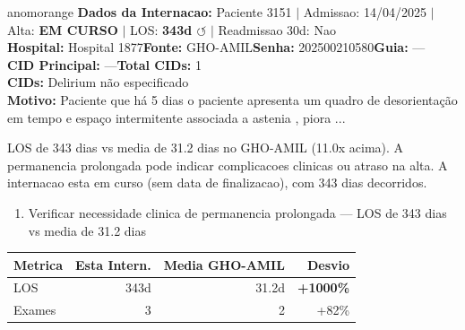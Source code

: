 \documentclass[a4paper,10pt]{article}
\begin{document}
\begin{anomalycard}[Internacao 3592 | GHO-AMIL | ALTO (z=3.08)]{anomorange}
\textbf{Dados da Internacao:} Paciente 3151 $\mid$ Admissao: 14/04/2025 $\mid$ Alta: \textcolor{anomorange}{\textbf{EM CURSO}} $\mid$ LOS: \textbf{343d \textcolor{anomorange}{$\circlearrowleft$}} $\mid$ Readmissao 30d: Nao\\
\textbf{Hospital:} Hospital 1877\quad\textbf{Fonte:} GHO-AMIL\quad\textbf{Senha:} 202500210580\quad\textbf{Guia:} ---\\
\textbf{CID Principal:} {\small ---}\quad\textbf{Total CIDs:} 1\\

\textbf{CIDs:} {\scriptsize Delirium não especificado}\\

\textbf{Motivo:} {\scriptsize Paciente que há 5 dias o paciente apresenta um quadro de desorientação em tempo e espaço intermitente associada a astenia , piora ...}\\

\vspace{2pt}\begin{tcolorbox}[colback=severityred!20,colframe=anomorange,title={\textbf{Interpretacao de Negocio}},fonttitle=\bfseries\small,left=4pt,right=4pt,top=3pt,bottom=3pt]
{\small LOS de 343 dias vs media de 31.2 dias no GHO-AMIL (11.0x acima). A permanencia prolongada pode indicar complicacoes clinicas ou atraso na alta. A internacao esta em curso (sem data de finalizacao), com 343 dias decorridos.}
\end{tcolorbox}
\begin{tcolorbox}[colback=severityyellow!30,colframe=anomorange,title={\textbf{Recomendacoes Especificas}},fonttitle=\bfseries\small,left=4pt,right=4pt,top=3pt,bottom=3pt]
\begin{enumerate}[nosep,leftmargin=16pt]
\item {\small Verificar necessidade clinica de permanencia prolongada --- LOS de 343 dias vs media de 31.2 dias}
\end{enumerate}
\end{tcolorbox}
\begin{center}\begin{tabular}{l r r r}\toprule\textbf{Metrica} & \textbf{Esta Intern.} & \textbf{Media GHO-AMIL} & \textbf{Desvio} \\\midrule
LOS & 343d & 31.2d & \textcolor{anomred}{\textbf{+1000\%}} \\
Exames & 3 & 2 & \textcolor{anomorange}{+82\%} \\
\bottomrule\end{tabular}\end{center}


\end{anomalycard}
\end{document}
